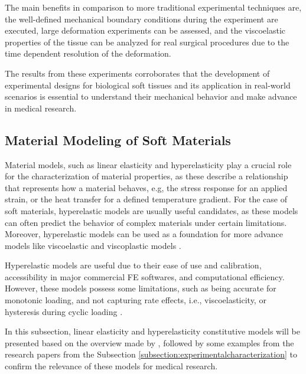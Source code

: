 The main benefits in comparison to more traditional experimental techniques are, 
the well-defined mechanical boundary conditions during the experiment are executed, 
large deformation experiments can be assessed, and the viscoelastic
properties of the tissue can be analyzed for real surgical procedures due to 
the time dependent resolution of the deformation.

The results from these experiments corroborates that the development of experimental designs for
biological soft tissues and its application in real-world scenarios is essential to understand 
their mechanical behavior and make advance in medical research.

\subsection{Material Modeling of Soft Materials}
\label{subsection:materialmodeling} 

Material models, such as linear elasticity and hyperelasticity play a crucial role for the characterization 
of material properties, as these describe a relationship that represents how a material behaves, e.g, 
the stress response for an applied strain, or the heat transfer for a defined temperature gradient.
For the case of soft materials, hyperelastic models are usually 
useful candidates, as these models can often predict the behavior of complex materials under certain limitations.
Moreover, hyperelastic models can be used as a foundation for more advance models like 
viscoelastic and viscoplastic models \cite{Bergström2015}. 

Hyperelastic models are useful due to their ease of use and calibration, accessibility in major commercial FE softwares, 
and computational efficiency. However, these models possess some limitations, such as being 
accurate for monotonic loading, and not capturing rate effects, i.e., viscoelasticity, or 
hysteresis during cyclic loading \cite{Bergström2015}.

In this subsection, linear elasticity and hyperelasticity constitutive models will be presented 
based on the overview made by \citet{Bergström2015}, followed by some examples from the research 
papers from the Subsection \ref{subsection:experimentalcharacterization} to confirm the relevance of these 
models for medical research.

